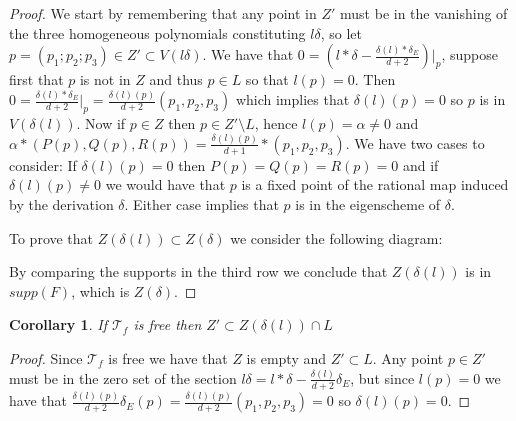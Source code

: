 \documentclass{article}
\newtheorem{corollary}{Corollary}[theorem]
\begin{document}
\begin{proof}
We start by remembering that any point in $Z'$ must be in the vanishing of the three homogeneous polynomials constituting $l\delta$, so let $p = (p_1;p_2;p_3) \in Z' \subset V(l\delta)$. We have that $0 = (l*\delta - \frac{\delta(l)*\delta_E}{d+2})|_p$, suppose first that $p$ is not in $Z$ and thus $p \in L$ so that $l(p)=0$. Then $0 = \frac{\delta(l)*\delta_E}{d+2}|_p = \frac{\delta(l)(p)}{d+2}(p_1,p_2,p_3)$ which implies that $\delta(l)(p) = 0$ so $p$ is in $V(\delta(l))$. Now if $p \in Z$ then $p \in Z' \setminus L$, hence $l(p) = \alpha \not = 0$ and $\alpha*(P(p),Q(p),R(p)) = \frac{\delta(l)(p)}{d+1}*(p_1,p_2,p_3)$. We have two cases to consider: If $\delta(l)(p) = 0$ then $P(p) = Q(p) = R(p) = 0$ and if $\delta(l)(p) \not = 0$ we would have that $p$ is a fixed point of the rational map induced by the derivation $\delta$. Either case implies that $p$ is in the eigenscheme of $\delta$.

To prove that $Z(\delta(l)) \subset Z(\delta)$ we consider the following diagram:
\begin{center}
\end{center}
By comparing the supports in the third row we conclude that $Z(\delta(l))$ is in $supp(F)$, which is $Z(\delta)$.
\end{proof}

\begin{corollary}
    If $\mathcal{T}_f$ is free then $Z' \subset Z(\delta(l)) \cap L$
\end{corollary}
\begin{proof}
    Since $\mathcal{T}_f$ is free we have that $Z$ is empty and $Z' \subset L$. Any point $p \in Z'$ must be in the zero set of the section $l\delta = l*\delta - \frac{\delta(l)}{d+2}\delta_E$, but since $l(p) = 0$ we have that $\frac{\delta(l)(p)}{d+2}\delta_E(p) = \frac{\delta(l)(p)}{d+2}(p_1,p_2,p_3) = 0$ so $\delta(l)(p) = 0$.
\end{proof}
\end{document}
